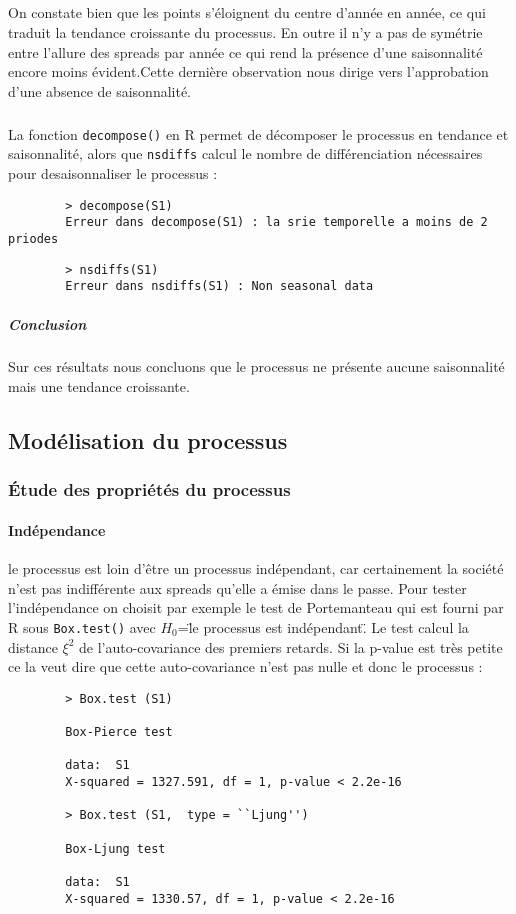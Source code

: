         \subparagraph{}     On constate bien que les points s'éloignent du centre d'année en
        année, ce qui traduit la tendance croissante du processus. En outre
        il n'y a pas de symétrie entre l'allure des spreads par année ce qui
        rend la présence d'une saisonnalité encore moins évident.Cette dernière
        observation nous dirige vers l'approbation  d'une
        absence de saisonnalité.  

        \subparagraph{} La fonction \verb+decompose()+  en R permet de décomposer le processus en
        tendance et saisonnalité, alors que \verb+nsdiffs+ calcul le nombre de
        différenciation nécessaires pour desaisonnaliser le processus :
        \begin{verbatim}
        > decompose(S1)
        Erreur dans decompose(S1) : la srie temporelle a moins de 2 priodes
        \end{verbatim}

        \begin{verbatim}
        > nsdiffs(S1)
        Erreur dans nsdiffs(S1) : Non seasonal data
        \end{verbatim}


        \subparagraph{Conclusion}
        Sur ces résultats nous concluons que le processus ne présente aucune
        saisonnalité mais une tendance croissante.
           
\subsection{Modélisation du processus}
    \subsubsection{Étude des propriétés du processus}    
        \paragraph{Indépendance} 
        le processus est loin d'être un processus indépendant, car certainement la
        société n'est pas indifférente aux spreads qu'elle a émise dans le passe.
        Pour tester l'indépendance on choisit par exemple le test de Portemanteau
        qui est fourni par R sous \verb+Box.test()+ avec $H_0$=\"le processus est
        indépendant\". Le test calcul
        la distance $\xi^2$ de l'auto-covariance des premiers retards. Si la p-value est très petite ce la
        veut dire que cette auto-covariance n'est pas nulle et donc le processus :
        \begin{verbatim}
        > Box.test (S1)

        Box-Pierce test

        data:  S1
        X-squared = 1327.591, df = 1, p-value < 2.2e-16

        > Box.test (S1,  type = ``Ljung'')

        Box-Ljung test

        data:  S1
        X-squared = 1330.57, df = 1, p-value < 2.2e-16

        \end{verbatim}

